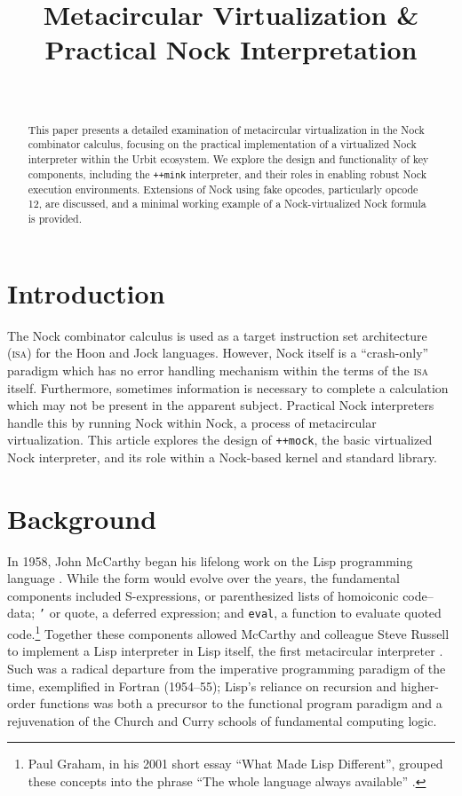 \documentclass[twoside]{article}
\title{Metacircular Virtualization \& \\ Practical Nock Interpretation}
\author{\authorname~\authorpatp \\ \affiliation}
\date{}
\begin{document}
\maketitle
\thispagestyle{firststyle}

\begin{abstract}
  \sloppy
  This paper presents a detailed examination of meta\-circular virtualization in the Nock combinator calculus, focusing on the practical implementation of a virtualized Nock interpreter within the Urbit ecosystem. We explore the design and functionality of key components, including the \lstinline[style=inlinecode]{++mink} interpreter, and their roles in enabling robust Nock execution environments.  Extensions of Nock using fake opcodes, particularly opcode 12, are discussed, and a minimal working example of a Nock-virtualized Nock formula is provided.
\end{abstract}

\setcounter{page}{71}

\tableofcontents

\section{Introduction}

The Nock combinator calculus is used as a target instruction set architecture (\textsc{isa}) for the Hoon and Jock languages.  However, Nock itself is a ``crash-only'' paradigm which has no error handling mechanism within the terms of the \textsc{isa} itself.  Furthermore, sometimes information is necessary to complete a calculation which may not be present in the apparent subject.  Practical Nock interpreters handle this by running Nock within Nock, a process of metacircular virtualization.  This article explores the design of \lstinline[style=inlinecode]{++mock}, the basic virtualized Nock interpreter, and its role within a Nock-based kernel and standard library.

\section{Background}

In 1958, John McCarthy began his lifelong work on the Lisp programming language \citep{McCarthy1996}.  While the form would evolve over the years, the fundamental components included S-expressions, or parenthesized lists of homoiconic code–data; \texttt{'} or quote, a deferred expression; and \texttt{eval}, a function to evaluate quoted code.\footnote{Paul Graham, in his 2001 short essay ``What Made Lisp Different'', grouped these concepts into the phrase ``The whole language always available'' \citep{Graham2001}.}  Together these components allowed McCarthy and colleague Steve Russell to implement a Lisp interpreter in Lisp itself, the first metacircular interpreter \citep{McCarthy1978}.  Such was a radical departure from the imperative programming paradigm of the time, exemplified in Fortran (1954–55); Lisp's reliance on recursion and higher-order functions was both a precursor to the functional program paradigm and a rejuvenation of the Church and Curry schools of fundamental computing logic.
\end{document}
